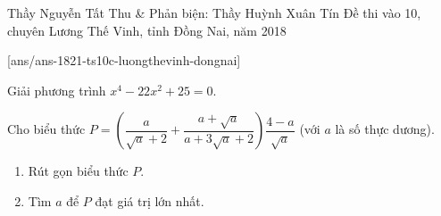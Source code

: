 
\begin{name}
{Thầy  Nguyễn Tất Thu \& Phản biện: Thầy Huỳnh Xuân Tín}
{Đề thi vào 10, chuyên Lương Thế Vinh, tỉnh Đồng Nai, năm 2018}
\end{name}
\setcounter{ex}{0}
[ans/ans-1821-ts10c-luongthevinh-dongnai]
\begin{ex}%
Giải phương trình $x^4-22x^2+25=0$.

\end{ex}
\begin{ex}%
	Cho biểu thức $P=\left(\dfrac{a}{\sqrt{a}+2}+\dfrac{a+\sqrt{a}}{a+3\sqrt{a}+2}\right)\dfrac{4-a}{\sqrt{a}}$ (với $a$ là số thực dương).
	\begin{enumerate}
		\item Rút gọn biểu thức $P$.
		\item  Tìm $a$ để $P$ đạt giá trị lớn nhất.
	\end{enumerate}
	
\end{ex}
